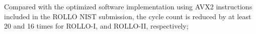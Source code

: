 \documentclass[submission]{iacrtrans}
\makeatletter
\newcommand{\tabincell}[2]{\begin{tabular}{@{}#1@{}}#2\end{tabular}}
\theoremstyle{plain}
\makeatother
\begin{document}
Compared with the optimized software implementation using AVX2 instructions included in the ROLLO NIST submission, the cycle count is reduced by at least 20 and 16 times for ROLLO-I, and ROLLO-II, respectively;
\end{document}
